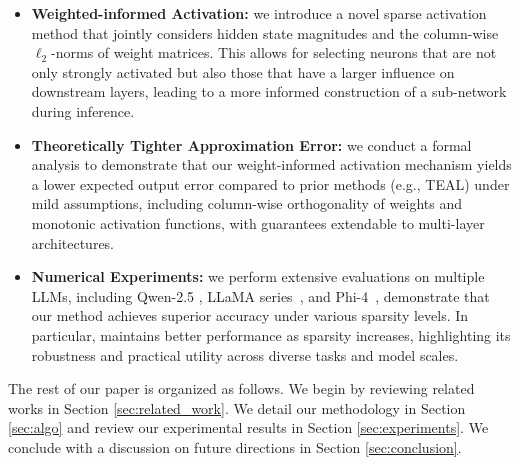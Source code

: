 \begin{itemize}[leftmargin=*, itemsep=3pt]
	\item \textbf{Weighted-informed Activation:} we introduce a novel sparse activation method that jointly considers hidden state magnitudes and the column-wise $\ell_2$-norms of weight matrices. This allows for selecting neurons that are not only strongly activated but also those that have a larger influence on downstream layers, leading to a more informed construction of a sub-network during inference.
	\item \textbf{Theoretically Tighter Approximation Error:} {we conduct a formal analysis to demonstrate that our weight-informed activation mechanism yields a lower expected output error compared to prior methods (e.g., TEAL) under mild assumptions, including column-wise orthogonality of weights and monotonic activation functions, with guarantees extendable to multi-layer architectures.}
	\item \textbf{Numerical Experiments:} {we perform extensive evaluations on multiple LLMs, including Qwen-2.5 \citep{bai2023qwen}, LLaMA series~\citep{touvron2023llama}, and Phi-4~\citep{abdin2024phi}, demonstrate that our method achieves superior accuracy under various sparsity levels. In particular, \algacro{} maintains better performance as sparsity increases, highlighting its robustness and practical utility across diverse tasks and model scales.}
\end{itemize}

The rest of our paper is organized as follows. We begin by reviewing related works in Section \ref{sec:related_work}. We detail our methodology in Section \ref{sec:algo} and review our experimental results in Section \ref{sec:experiments}. We conclude with a discussion on future directions in Section \ref{sec:conclusion}.


